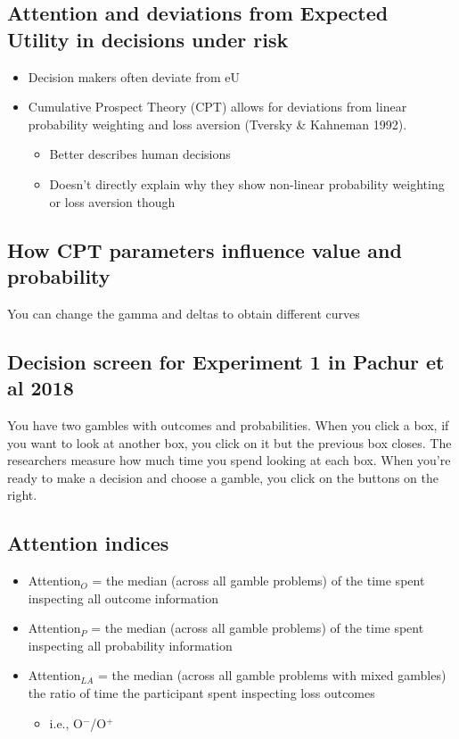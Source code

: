 \subsection{Attention and deviations from Expected Utility in decisions under risk}
\begin{itemize}
    \item Decision makers often deviate from eU
    \item Cumulative Prospect Theory (CPT) allows for deviations from linear probability weighting and loss aversion (Tversky & Kahneman 1992). 
\begin{itemize}
    \item Better describes human decisions
    \item Doesn’t directly explain why they show non-linear probability weighting or loss aversion though  
\end{itemize}

\end{itemize}
\subsection{How CPT parameters influence value and probability}
You can change the gamma and deltas to obtain different curves
\subsection{Decision screen for Experiment 1 in Pachur et al 2018}
You have two gambles with outcomes and probabilities. When you click a box, if you want to look at another box, you click on it but the previous box closes. The researchers measure how much time you spend looking at each box. When you're ready to make a decision and choose a gamble, you click on the buttons on the right.
\subsection{Attention indices}
\begin{itemize}
    \item Attention$_{O}$ = the median (across all gamble problems) of the time spent inspecting all outcome information
    \item Attention$_{P}$ = the median (across all gamble problems) of the time spent inspecting all probability information
    \item Attention$_{LA}$ = the median (across all gamble problems with mixed gambles) the ratio of time the participant spent inspecting loss outcomes 
    \begin{itemize}
        \item i.e., O$^{-}$/O$^{+}$
    \end{itemize}
\end{itemize}
